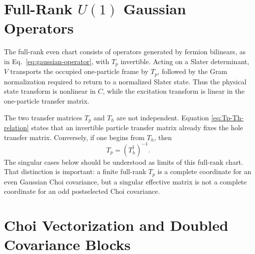 \documentclass[aps,prb,onecolumn,nofootinbib,superscriptaddress]{revtex4-2}
\theoremstyle{plain}
\theoremstyle{definition}
\begin{document}
\section{Full-Rank \texorpdfstring{\(U(1)\)}{U(1)} Gaussian Operators}

The full-rank even chart consists of operators generated by fermion bilinears,
as in Eq.~\eqref{eq:gaussian-operator}, with \(T_p\) invertible.  Acting on a
Slater determinant, \(V\) transports the occupied one-particle frame by
\(T_p\), followed by the Gram normalization required to return to a normalized
Slater state.  Thus the physical state transform is nonlinear in \(C\), while
the excitation transform is linear in the one-particle transfer matrix.

The two transfer matrices \(T_p\) and \(T_h\) are not independent.  Equation
\eqref{eq:Tp-Th-relation} states that an invertible particle transfer matrix
already fixes the hole transfer matrix.  Conversely, if one begins from
\(T_h\), then
\begin{equation}
  T_p=(T_h^\dagger)^{-1}.
  \label{eq:Th-to-Tp}
\end{equation}
The singular cases below should be understood as limits of this full-rank
chart.  That distinction is important: a finite full-rank \(T_p\) is a complete
coordinate for an even Gaussian Choi covariance, but a singular effective
matrix is not a complete coordinate for an odd postselected Choi covariance.

\section{Choi Vectorization and Doubled Covariance Blocks}
\end{document}
